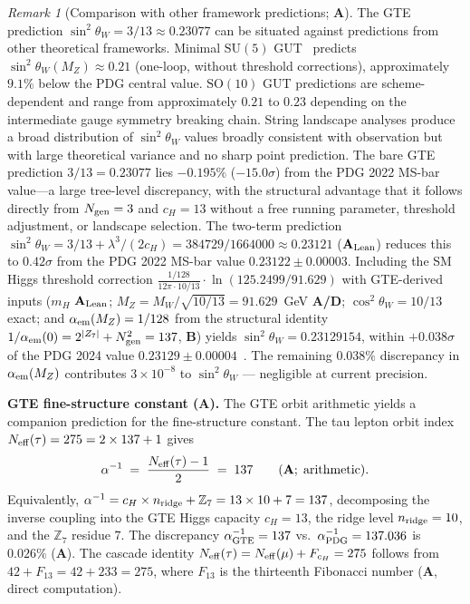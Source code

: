 \documentclass[11pt]{article}
\theoremstyle{remark}
\newtheorem{remark}[theorem]{Remark}
\newcommand{\Ngen}{N_{\rm gen}}
\newcommand{\cH}{c_H}
\newcommand{\sinwsq}{\sin^2\!\theta_W}
\newcommand{\CatA}{\textbf{A}}
\newcommand{\CatAL}{\ensuremath{\textbf{A}_{\rm Lean}}}
\newcommand{\CatAD}{\textbf{A/D}}
\newcommand{\CatB}{\textbf{B}}
\begin{document}
\begin{remark}[Comparison with other framework predictions; $\CatA$]
\label{rem:framework_comparison}
The GTE prediction $\sinwsq = 3/13 \approx 0.23077$ can be situated against predictions
from other theoretical frameworks.
Minimal $\mathrm{SU}(5)$ GUT~\cite{GeorgiGlashow1974} predicts $\sinwsq(M_Z) \approx
0.21$ (one-loop, without threshold corrections), approximately $9.1\%$ below the PDG
central value.
$\mathrm{SO}(10)$ GUT predictions are scheme-dependent and range from approximately
$0.21$ to $0.23$ depending on the intermediate gauge symmetry breaking chain.
String landscape analyses produce a broad distribution of $\sinwsq$ values broadly
consistent with observation but with large theoretical variance and no sharp point
prediction.
The bare GTE prediction $3/13 = 0.23077$ lies $-0.195\%$ ($-15.0\sigma$) from the
PDG 2022 MS-bar value---a large tree-level discrepancy, with the structural advantage
that it follows directly from $\Ngen = 3$ and $\cH = 13$ without a free running
parameter, threshold adjustment, or landscape selection.
The two-term prediction $\sinwsq = 3/13 + \lambda^3/(2\cH) = 384729/1664000 \approx
0.23121$ (\CatAL) reduces this to $0.42\sigma$ from the PDG 2022 MS-bar value
$0.23122 \pm 0.00003$.
Including the SM Higgs threshold correction
$\frac{1/128}{12\pi \cdot 10/13} \cdot \ln(125.2499/91.629)$ with
GTE-derived inputs ($m_H$ \CatAL; $M_Z = M_W/\!\sqrt{10/13} = 91.629$~GeV \CatAD;
$\cos^2\theta_W = 10/13$ exact; and $\alpha_{\rm em}(M_Z) = 1/128$ from the
structural identity $1/\alpha_{\rm em}(0) = 2^{|Z_7|} + \Ngen^2 = 137$, \CatB)
yields $\sinwsq = 0.23129154$, within $+0.038\sigma$ of the PDG 2024 value
$0.23129 \pm 0.00004$~\cite{ParticleDataGroup2024}.  The remaining $0.038\%$
discrepancy in $\alpha_{\rm em}(M_Z)$ contributes $3 \times 10^{-8}$ to $\sinwsq$
--- negligible at current precision.
\end{remark}

\medskip

\textbf{GTE fine-structure constant ($\CatA$).}
The GTE orbit arithmetic yields a companion prediction for the fine-structure constant.
The tau lepton orbit index $N_{\rm eff}(\tau) = 275 = 2\times 137 + 1$ gives
\begin{equation}
  \alpha^{-1} \;=\; \frac{N_{\rm eff}(\tau) - 1}{2} \;=\; 137
  \qquad (\CatA;\;\text{arithmetic}).
\end{equation}
Equivalently, $\alpha^{-1} = \cH \times n_{\rm ridge} + \mathbb{Z}_7 = 13 \times 10 + 7 = 137$,
decomposing the inverse coupling into the GTE Higgs capacity $\cH = 13$, the ridge
level $n_{\rm ridge} = 10$, and the $\mathbb{Z}_7$ residue $7$.
The discrepancy $\alpha_{\rm GTE}^{-1} = 137$ vs.\ $\alpha_{\rm PDG}^{-1} = 137.036$
is $0.026\%$ ($\CatA$).
The cascade identity $N_{\rm eff}(\tau) = N_{\rm eff}(\mu) + F_{\cH} = 275$ follows
from $42 + F_{13} = 42 + 233 = 275$, where $F_{13}$ is the thirteenth Fibonacci number
($\CatA$, direct computation).
\end{document}
